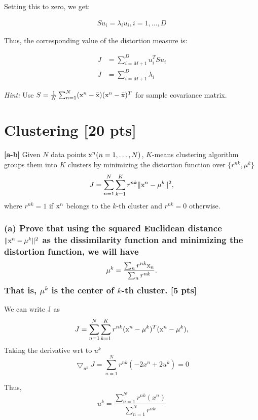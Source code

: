 \documentclass[twoside,10pt]{article}
\begin{document}
Setting this to zero, we get:

\begin{equation} \nonumber
\begin{split}
S u_i = \lambda_i u_i, i = 1, ... , D 
\end{split}
\end{equation}

Thus, the corresponding value of the distortion measure is:

\begin{equation} \nonumber
\begin{split}
J &= \sum_{i=M+1}^D u_i^T S u_i \\
J &= \sum_{i=M+1}^D \lambda_i
\end{split}
\end{equation}

\emph{Hint:} Use $S = \frac{1}{N} \sum_{n=1}^N (\text x^n - \bar{\text x})(\text x^n -
\bar{\text x})^T$ for sample covariance matrix. \vspace{1cm}


\section{Clustering [20 pts]}

\textbf{[a-b]} Given $N$ data points $\text x^n (n=1,\dots,N)$, $K$-means clustering algorithm groups them into $K$ clusters by minimizing the distortion function over $\{ r^{nk}, \mu^k \}$
$$J=\sum_{n=1}^N\sum_{k=1}^Kr^{nk} \|\text x^n-\mu^k\|^2,$$
where $r^{nk}=1$ if $\text x^n$ belongs to the $k$-th cluster and $r^{nk}=0$ otherwise.

\subsubsection*{(a) Prove that using the squared Euclidean distance $\|\text x^n-\mu^k\|^2$ as the dissimilarity function and minimizing the distortion function, we will have 
   $$\mu^k=\frac{\sum_n r^{nk} \text x_n}{\sum_n r^{nk}}.$$
   That is, $\mu^k$ is the center of $k$-th cluster. [5 pts]}
 We can write J as 
$$J=\sum_{n=1}^N\sum_{k=1}^Kr^{nk} (\text x^n-\mu^k)^T (\text x^n-\mu^k),$$
Taking the derivative wrt to $u^k$
$$ \bigtriangledown_{u^k} J=\sum_{n=1}^N r^{nk}(-2x^n + 2 u^k) = 0$$

Thus, \\
\begin{equation}
u^k=\frac{\sum_{n=1}^N r^{nk}(x^n) }{\sum_{n=1}^N r^{nk}}\nonumber
\end{equation}
\end{document}
